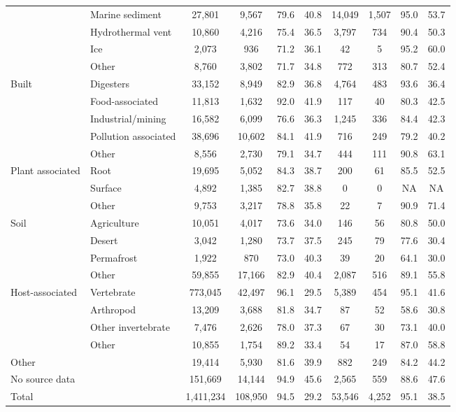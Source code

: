 \documentclass[]{article}
\begin{document}
\begin{table}[!ht]
{\begin{tabular}{llcccccccc}
   & Marine sediment &    27,801 &   9,567 & 79.6 & 40.8 & 14,049 & 1,507 &  95.0 &  53.7 \\ 
   & Hydrothermal vent &    10,860 &   4,216 & 75.4 & 36.5 &  3,797 &   734 &  90.4 &  50.3 \\ 
   & Ice &     2,073 &     936 & 71.2 & 36.1 &     42 &     5 &  95.2 &  60.0 \\ 
   & Other &     8,760 &   3,802 & 71.7 & 34.8 &    772 &   313 &  80.7 &  52.4 \\ 
  Built & Digesters &    33,152 &   8,949 & 82.9 & 36.8 &  4,764 &   483 &  93.6 &  36.4 \\ 
   & Food-associated &    11,813 &   1,632 & 92.0 & 41.9 &    117 &    40 &  80.3 &  42.5 \\ 
   & Industrial/mining &    16,582 &   6,099 & 76.6 & 36.3 &  1,245 &   336 &  84.4 &  42.3 \\ 
   & Pollution associated &    38,696 &  10,602 & 84.1 & 41.9 &    716 &   249 &  79.2 &  40.2 \\ 
   & Other &     8,556 &   2,730 & 79.1 & 34.7 &    444 &   111 &  90.8 &  63.1 \\ 
  Plant associated & Root &    19,695 &   5,052 & 84.3 & 38.7 &    200 &    61 &  85.5 &  52.5 \\ 
   & Surface &     4,892 &   1,385 & 82.7 & 38.8 &      0 &     0 &    NA &    NA \\ 
   & Other &     9,753 &   3,217 & 78.8 & 35.8 &     22 &     7 &  90.9 &  71.4 \\ 
  Soil & Agriculture &    10,051 &   4,017 & 73.6 & 34.0 &    146 &    56 &  80.8 &  50.0 \\ 
   & Desert &     3,042 &   1,280 & 73.7 & 37.5 &    245 &    79 &  77.6 &  30.4 \\ 
   & Permafrost &     1,922 &     870 & 73.0 & 40.3 &     39 &    20 &  64.1 &  30.0 \\ 
   & Other &    59,855 &  17,166 & 82.9 & 40.4 &  2,087 &   516 &  89.1 &  55.8 \\ 
  Host-associated & Vertebrate &   773,045 &  42,497 & 96.1 & 29.5 &  5,389 &   454 &  95.1 &  41.6 \\ 
   & Arthropod &    13,209 &   3,688 & 81.8 & 34.7 &     87 &    52 &  58.6 &  30.8 \\ 
   & Other invertebrate &     7,476 &   2,626 & 78.0 & 37.3 &     67 &    30 &  73.1 &  40.0 \\ 
   & Other &    10,855 &   1,754 & 89.2 & 33.4 &     54 &    17 &  87.0 &  58.8 \\ 
  Other &  &    19,414 &   5,930 & 81.6 & 39.9 &    882 &   249 &  84.2 &  44.2 \\ 
  No source data &  &   151,669 &  14,144 & 94.9 & 45.6 &  2,565 &   559 &  88.6 &  47.6 \\ 
   \hline
Total &  & 1,411,234 & 108,950 & 94.5 & 29.2 & 53,546 & 4,252 &  95.1 &  38.5 \\ 
   \hline
\end{tabular}
}
\end{table}
\end{document}
